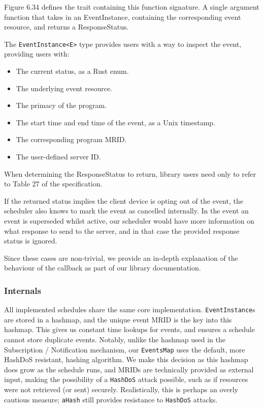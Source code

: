 Figure 6.34 defines the trait containing this function signature. A single argument function that takes in an EventInstance, containing the corresponding event resource, and returns a ResponseStatus. 

The \texttt{EventInstance<E>} type provides users with a way to inspect the event, providing users with:

\begin{itemize}
    \item The current status, as a Rust enum.
    \item The underlying event resource.
    \item The primacy of the program.
    \item The start time and end time of the event, as a Unix timestamp.
    \item The corresponding program MRID.
    \item The user-defined server ID.
\end{itemize}

When determining the ResponseStatus to return, library users need only to refer to Table 27 of the specification.

If the returned status implies the client device is opting out of the event, the scheduler also knows to mark the event as cancelled internally. In the event an event is superseded whilst active, our scheduler would have more information on what response to send to the server, and in that case the provided response status is ignored.

Since these cases are non-trivial, we provide an in-depth explanation of the behaviour of the callback as part of our library documentation.

\subsubsection{Internals}
All implemented schedules share the same core implementation. \texttt{EventInstance}s are stored in a hashmap, and the unique event MRID is the key into this hashmap. This gives us constant time lookups for events, and ensures a schedule cannot store duplicate events. Notably, unlike the hashmap used in the Subscription / Notification mechanism, our \texttt{EventsMap} uses the default, more HashDoS resistant, hashing algorithm. We make this decision as this hashmap does grow as the schedule runs, and MRIDs are technically provided as external input, making the possibility of a \texttt{HashDoS} attack possible, such as if resources were not retrieved (or sent) securely.
Realistically, this is perhaps an overly cautious measure; \texttt{aHash} still provides resistance to \texttt{HashDoS} attacks.

